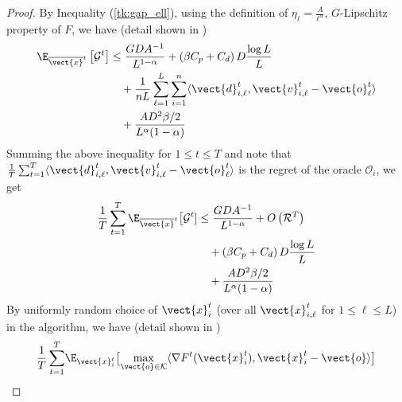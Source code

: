\begin{proof}
By Inequality (\ref{tk:gap_ell}), using the definition of $\eta_{\ell} = \frac{A}{\ell^{\alpha}}$, $G$-Lipschitz property of $F$, we have (detail shown in 
\cite{anonymous_2021_5572198})
%
    \begin{align}		\label{tk:exp_gap}
        \E_{\overline{\vect{x}}^t} \left[ \mathcal{G}^t \right] 
        & \leq \frac{GDA^{-1}}{L^{1-\alpha}} \notag 
        		+ \left( \beta C_p + C_d \right)D\frac{\log L}{L} \notag \\
        		& \quad + \frac{1}{nL}\sum_{\ell=1}^{L}\sum_{i=1}^{n}\langle \vect{d}^t_{i,\ell}, \vect{v}^t_{i,\ell} - \vect{o}^t_{\ell} \rangle \notag \\
        		& \quad + \frac{AD^2 \beta/2}{L^{\alpha}(1-\alpha)}
    \end{align}
%
Summing the above inequality for $1 \leq t \leq T$ and
note that $\frac{1}{T}\sum_{t=1}^{T}\langle \vect{d}^t_{i,\ell}, \vect{v}^t_{i,\ell} - \vect{o}^t_{\ell} \rangle$ 
is the regret of the oracle $\mathcal{O}_{i}$, we get
%
    \begin{align}		\label{tk:case1_finalbound}
        \frac{1}{T}\sum_{t=1}^{T} \E_{\overline{\vect{x}}^t} \bigl[\mathcal{G}^t]  
         & \leq \frac{GDA^{-1}}{L^{1-\alpha}} + O \left(\mathcal{R}^{T}\right) \notag \\
        & \quad + \left( \beta C_p + C_d \right)D\frac{\log L}{L} \notag \\
        & \quad + \frac{AD^2 \beta/2}{L^{\alpha}(1-\alpha)}
    \end{align} 
%    
By uniformly random choice of $\vect{x}^{t}_{i}$ (over all $\vect{x}^{t}_{i,\ell}$ for $1 \leq \ell \leq L$) in the algorithm, we have (detail shown in
\cite{anonymous_2021_5572198})
\begin{align}	\label{tk:connection}
\frac{1}{T}\sum_{t=1}^{T} &\E_{\vect{x}^t_i} \bigl [ \max_{\vect{o} \in \mathcal{K}}\langle \nabla F^{t}(\vect{x}^t_{i}), \vect{x}^t_{i} - \vect{o}\rangle \bigr] \notag \\

\end{align}
\end{proof}

